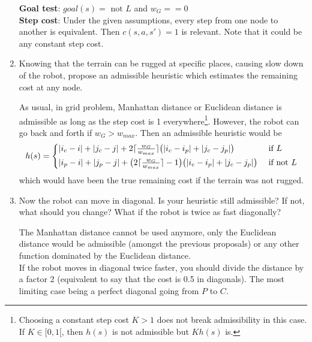 \documentclass[11pt, a4paper]{article}
\begin{document}
\begin{enumerate}
\begin{solution}
        \textbf{Goal test}: $goal(s) = \text{ not }L$ and $w_G == 0$\\
        
        \textbf{Step cost}: Under the given assumptions, every step from one node to another is equivalent. Then $c(s,a,s') = 1$ is relevant. Note that it could be any constant step cost.\\
    \end{solution}
    \item Knowing that the terrain can be rugged at specific places, causing slow down of the robot, propose an admissible heuristic which estimates the remaining cost at any node.
    
    \begin{solution}
        As usual, in grid problem, Manhattan distance or Euclidean distance is admissible as long as the step cost is 1 everywhere\footnote{Choosing a constant step cost $K > 1$ does not break admissibility in this case. If $K \in [0,1[$, then $h(s)$ is not admissible but $Kh(s)$ is.}. However, the robot can go back and forth if $w_G > w_{max}$. Then an admissible heuristic would be
        \[h(s) = \begin{cases*}
            |i_c - i| + |j_c - j| + 2\ceil{\frac{w_G}{w_{max}}}\big(|i_c - i_p| + |j_c - j_p|\big)\ &\text{if $L$}\\
            |i_p - i| + |j_p - j| + \big(2\ceil{\frac{w_G}{w_{max}}} - 1\big)\big(|i_c - i_p| + |j_c - j_p|\big)\ &\text{if not $L$}
        \end{cases*}\]
        which would have been the true remaining cost if the terrain was not rugged.
    \end{solution}

    \item Now the robot can move in diagonal. Is your heuristic still admissible? If not, what should you change? What if the robot is twice as fast diagonally?

    \begin{solution}
        The Manhattan distance cannot be used anymore, only the Euclidean distance would be admissible (amongst the previous proposals) or any other function dominated by the Euclidean distance.\\
        If the robot moves in diagonal twice faster, you should divide the distance by a factor 2 (equivalent to say that the cost is 0.5 in diagonals). The most limiting case being a perfect diagonal going from $P$ to $C$.
    \end{solution}
\end{enumerate}
\end{document}

